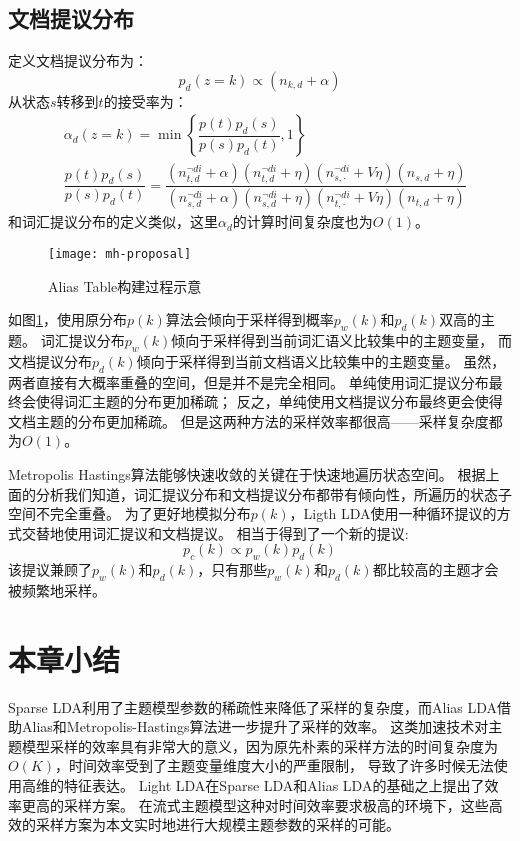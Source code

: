 \subsection{文档提议分布}
定义文档提议分布为：
\begin{equation}
p_d(z = k) \propto (n_{k,d} +\alpha)
\end{equation}
从状态$s$转移到$t$的接受率为：
\begin{equation}
\begin{aligned}
& \alpha_d(z=k) = \min \left\{\dfrac{p(t) p_d(s)}{p(s)p_d(t)}, 1\right\} \\
& \dfrac{p(t) p_d(s)}{p(s)p_d(t)}=
\dfrac{ (n_{t,d}^{\neg di} + \alpha)(n_{t,d}^{\neg di} + \eta) (n_{s,\cdot}^{\neg di} + V \eta) (n_{s,d} + \eta) }
{ (n_{s,d}^{\neg di} + \alpha)(n_{s,d}^{\neg di} + \eta) (n_{t,\cdot}^{\neg di} + V \eta) (n_{t,d} + \eta) }
\end{aligned}
\end{equation}
和词汇提议分布的定义类似，这里$\alpha_d$的计算时间复杂度也为$O(1)$。

\begin{figure}[htb]\centering
\texttt{[image: mh-proposal]}
\caption{Alias Table构建过程示意}
\label{fig:mh-proposal}       %
\end{figure}

如图\ref{fig:mh-proposal}，使用原分布$p(k)$算法会倾向于采样得到概率$p_w(k)$和$p_d(k)$双高的主题。
词汇提议分布$p_w(k)$倾向于采样得到当前词汇语义比较集中的主题变量，
而文档提议分布$p_d(k)$倾向于采样得到当前文档语义比较集中的主题变量。
虽然，两者直接有大概率重叠的空间，但是并不是完全相同。
单纯使用词汇提议分布最终会使得词汇主题的分布更加稀疏；
反之，单纯使用文档提议分布最终更会使得文档主题的分布更加稀疏。
但是这两种方法的采样效率都很高——采样复杂度都为$O(1)$。

Metropolis Hastings算法能够快速收敛的关键在于快速地遍历状态空间。
根据上面的分析我们知道，词汇提议分布和文档提议分布都带有倾向性，所遍历的状态子空间不完全重叠。
为了更好地模拟分布$p(k)$，Ligth LDA使用一种循环提议的方式交替地使用词汇提议和文档提议。
相当于得到了一个新的提议:
\begin{equation}
p_c(k) \propto p_w(k) p_d(k)
\end{equation}
该提议兼顾了$p_w(k)$和$p_d(k)$，只有那些$p_w(k)$和$p_d(k)$都比较高的主题才会被频繁地采样。

\section{本章小结}
Sparse LDA利用了主题模型参数的稀疏性来降低了采样的复杂度，而Alias LDA借助Alias和Metropolis-Hastings算法进一步提升了采样的效率。
这类加速技术对主题模型采样的效率具有非常大的意义，因为原先朴素的采样方法的时间复杂度为$O(K)$，时间效率受到了主题变量维度大小的严重限制，
导致了许多时候无法使用高维的特征表达。
Light LDA在Sparse LDA和Alias LDA的基础之上提出了效率更高的采样方案。
在流式主题模型这种对时间效率要求极高的环境下，这些高效的采样方案为本文实时地进行大规模主题参数的采样的可能。

